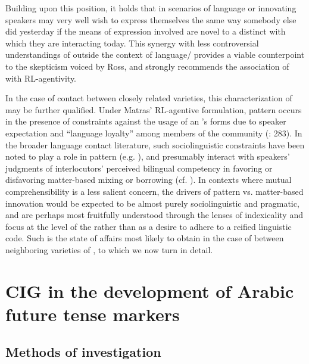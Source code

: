 \documentclass[output=paper]{langsci/langscibook}
\begin{document}
Building upon this position, it holds that in scenarios of language or  innovating speakers may very well wish to express themselves the same way somebody else did yesterday if the means of expression involved are novel to a distinct  with which they are interacting today. This synergy with less controversial understandings of  outside the context of language/ provides a viable counterpoint to the skepticism voiced by Ross, and strongly recommends the association of  with RL-agentivity.

In the case of contact between closely related varieties, this characterization of  may be further qualified. Under Matras’ RL-agentive formulation, pattern  occurs in the presence of constraints against the usage of an ’s forms due to speaker expectation and “language loyalty” among members of the  community (\citeyear{Matras2011gram}: 283).  In the broader language contact literature, such sociolinguistic constraints have been noted to play a role in pattern  (e.g. \citealt{Epps2005}), and presumably interact with speakers’ judgments of interlocutors’ perceived bilingual competency in favoring or disfavoring matter-based mixing or borrowing (cf. \citealt{Grosjean2001}). In contexts where mutual comprehensibility is a less salient concern, the drivers of pattern vs. matter-based innovation would be expected to be almost purely sociolinguistic and pragmatic, and are perhaps most fruitfully understood through the lenses of indexicality \citep{Silverstein2003} and focus at the level of the  \citep{LePageTabouret-Keller1985} rather than as a desire to adhere to a reified linguistic code. Such is the state of affairs most likely to obtain in the case of  between neighboring varieties of , to which we now turn in detail.

\section{ CIG in the development of Arabic future tense markers}

\subsection{ Methods of investigation}
\end{document}
